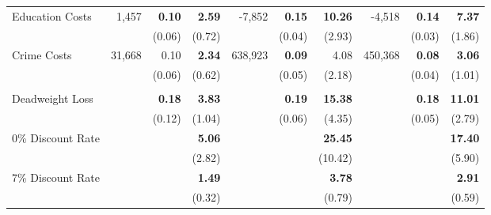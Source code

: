 \begin{tabular}{l r r r r r r r r r}
Education Costs	&	1,457	&	\textbf{0.10}	&	\textbf{2.59}	&	-7,852	&	\textbf{0.15}	&	\textbf{10.26}	&	-4,518	&	\textbf{0.14}	&	\textbf{7.37}	\\
	&		&	(0.06)	&	(0.72)	&		&	(0.04)	&	(2.93)	&		&	(0.03)	&	(1.86)	\\
Crime Costs	&	31,668	&	0.10	&	\textbf{2.34}	&	638,923	&	\textbf{0.09}	&	4.08	&	450,368	&	\textbf{0.08}	&	\textbf{3.06}	\\
	&		&	(0.06)	&	(0.62)	&		&	(0.05)	&	(2.18)	&	&	(0.04)	&	(1.01)	\\ \\
Deadweight Loss	&		&	\textbf{0.18}	&	\textbf{3.83}	&		&	\textbf{0.19}	&	\textbf{15.38}	&		&	\textbf{0.18}	&	\textbf{11.01}	\\
	&		&	(0.12)	&	(1.04)	&		&	(0.06)	&	(4.35)	&		&	(0.05)	&	(2.79)	\\
0\% Discount Rate	&		&		&	\textbf{5.06}	&		&		&	\textbf{25.45}	&		&		&	\textbf{17.40}	\\
	&		&		&	(2.82)	&		&		&	(10.42)	&		&		&	(5.90)	\\
7\% Discount Rate	&		&		&	\textbf{1.49}	&		&		&	\textbf{3.78}	&		&		&	\textbf{2.91}	\\
	&		&		&	(0.32)	&		&		&	(0.79)	&		&		&	(0.59)	\\
\bottomrule																			
\end{tabular}																			

